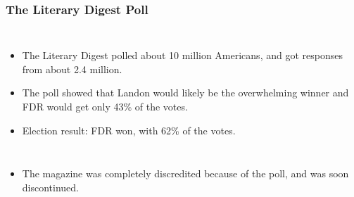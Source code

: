 \documentclass[slidestop,compress,mathserif]{beamer}
\begin{document}

\begin{frame}
\frametitle{The Literary Digest Poll}

\begin{columns}


\begin{itemize}

\item The Literary Digest polled about 10 million Americans, and got responses from about 2.4 million.

\item The poll showed that Landon would likely be the overwhelming winner and FDR would get only 43\% of the votes.

\item Election result:  FDR won, with 62\% of the votes.

\end{itemize}



\end{columns}

\begin{itemize}

\item The magazine was completely discredited because of the poll, and was soon discontinued.

\end{itemize}

\end{frame}

\end{document}
